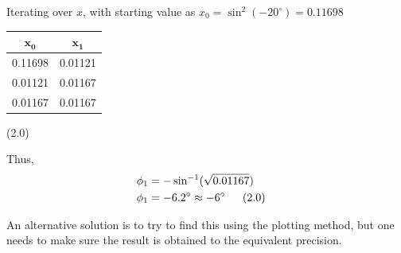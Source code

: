 \begin{description}
Iterating over $x$, with starting value as $x_0 = \sin^2(-20^\circ) = 0.11698$
\begin{center}
\begin{tabular}{cc}
$\mathbf{x_0}$ & $\mathbf{x_1}$\\
\hline
0.11698 & 0.01121\\
0.01121 & 0.01167\\
0.01167 & 0.01167\\
\end{tabular}
\end{center}
\hfill(2.0)

Thus,
\begin{align*}
\phi_1 &= -\sin^{-1}(\sqrt{0.01167})\\
\phi_1 &= -6.2^\circ \approx -6^\circ & &\hspace{-2em}(2.0)
\end{align*}

An alternative solution is to try to find this using the plotting method, but one needs to
make sure the result is obtained to the equivalent precision.
\end{description}

